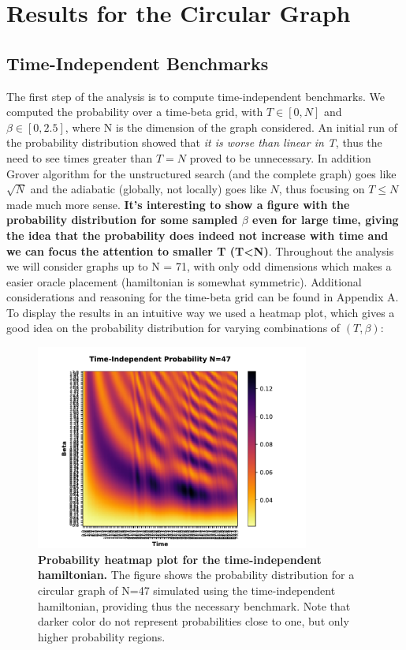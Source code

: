 \section{Results for the Circular Graph}

    \subsection{Time-Independent Benchmarks}
        The first step of the analysis is to compute time-independent benchmarks. We computed the probability over a time-beta grid, with $T\in[0,N]$ and $\beta\in[0,2.5]$, where N is the dimension of the graph considered. An initial run of the probability distribution showed that \textit{it is worse than linear in T}, thus the need to see times greater than $T=N$ proved to be unnecessary. In addition Grover algorithm for the unstructured search (and the complete graph) goes like $\sqrt{N}$ and the adiabatic (globally, not locally) goes like $N$, thus focusing on $T \leq N$ made much more sense. \textbf{It's interesting to show a figure with the probability distribution for some sampled $\beta$ even for large time, giving the idea that the probability does indeed not increase with time and we can focus the attention to smaller T (T<N)}.
        Throughout the analysis we will consider graphs up to N = 71, with only odd dimensions which makes a easier oracle placement (hamiltonian is somewhat symmetric). Additional considerations and reasoning for the time-beta grid can be found in Appendix A. \\


        To display the results in an intuitive way we used a heatmap plot, which gives a good idea on the probability distribution for varying combinations of $(T,\beta)$:

          \begin{figure}[ht]
            \centering
            \includegraphics[width=9cm]{./figures/time_independent_benchmark_47}%
            \caption[Probability heatmap plot for the time-independent hamiltonian, N=47]{\textbf{Probability heatmap plot for the time-independent hamiltonian.} The figure shows the probability distribution for a circular graph of N=47 simulated using the time-independent hamiltonian, providing thus the necessary benchmark. Note that darker color do not represent probabilities close to one, but only higher probability regions.}
          \end{figure}

